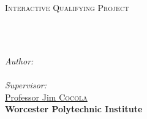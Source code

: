 \documentclass[
11pt, %
english, %
singlespacing, %
headsepline, %
]{MastersDoctoralThesis} %
\author{Ethan \textsc{Chandler}} %
\begin{document}
\frontmatter %

\pagestyle{plain} %


\begin{titlepage}
\begin{center}

\vspace*{1px}
{\scshape\LARGE \univname\par}\vspace{1.5cm} %
\textsc{\Large Interactive Qualifying Project}\\[0.5cm] %

\HRule \\[0.4cm] %
{\huge \bfseries \ttitle\par}\vspace{0.4cm} %
\HRule \\[1.5cm] %
 
\begin{minipage}[t]{0.4\textwidth}
\begin{flushleft} \large
\emph{Author:}\\
\href{https://www.linkedin.com/in/echandler5956f/}{\authorname}\\ %
\vspace{0.4cm}
\emph{Supervisor:} \\
\href{https://www.wpi.edu/people/faculty/jcocola}{Professor Jim \textsc{Cocola}}\\
{\small \bfseries Worcester Polytechnic Institute}
\end{flushleft}
\end{minipage}
\begin{minipage}[t]{0.4\textwidth}
\begin{flushright} \large


\end{flushright}
\end{minipage}
\end{center}
\end{titlepage}
\end{document}
